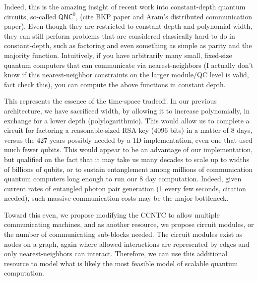 \documentclass{article}
\begin{document}
Indeed, this is the amazing insight of recent work into constant-depth
quantum circuits, so-called $\textsf{QNC}^0$, (cite BKP paper and Aram's
distributed communication paper). Even though
they are restricted to constant depth and polynomial width, they can still
perform problems that are considered classically hard to do in
constant-depth, such as factoring and even something as simple as parity
and the majority function. Intuitively, if you have arbitrarily many
small, fixed-size quantum computers that can communicate via
nearest-neighbors (I actually don't know if this nearest-neighbor constraints
on the larger module/QC level is valid, fact check this), you can compute
the above functions in constant depth.

This represents the essence of the time-space tradeoff. In our previous
architecture, we have sacrificed width, by allowing it to increase polynomially,
in exchange for a lower depth (polylogarithmic). This would allow us to
complete a circuit for factoring a reasonable-sized RSA key (4096 bits)
in a matter of 8 days, versus the 427 years possibly needed by a 1D
implementation, even one that used much fewer qubits. This would appear to
be an advantage of our implementation, but qualified on the fact that it may
take us many decades to scale up to widths of billions of qubits, or to
sustain entanglement among millions of communication quantum computers long
enough to run our 8 day computation. Indeed, given current rates of
entangled photon pair generation (1 every few seconds, citation needed),
such massive communication costs may be the major bottleneck.

Toward this even, we propose modifying the CCNTC to allow multiple
communicating machines, and as another resource, we propose circuit
modules, or the number of communicating sub-blocks needed. The circuit
modules exist as nodes on a graph, again where allowed interactions are
represented by edges and only nearest-neighbors can interact. Therefore,
we can use this additional resource to model what is likely the most
feasible model of scalable quantum computation.
\end{document}
